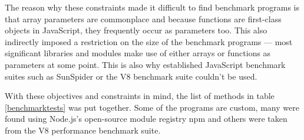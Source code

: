 The reason why these constraints made it difficult to find benchmark programs is that array parameters are commonplace and because functions are first-class objects in JavaScript, they frequently occur as parameters too. This also indirectly imposed a restriction on the size of the benchmark programs --- most significant libraries and modules make use of either arrays or functions as parameters at some point. This is also why established JavaScript benchmark suites such as SunSpider or the V8 benchmark suite couldn't be used.

With these objectives and constraints in mind, the list of methods in table \ref{benchmarktests} was put together. Some of the programs are custom, many were found using \textsf{Node.js}'s open-source module registry \textsf{npm} and others were taken from the V8 performance benchmark suite.

